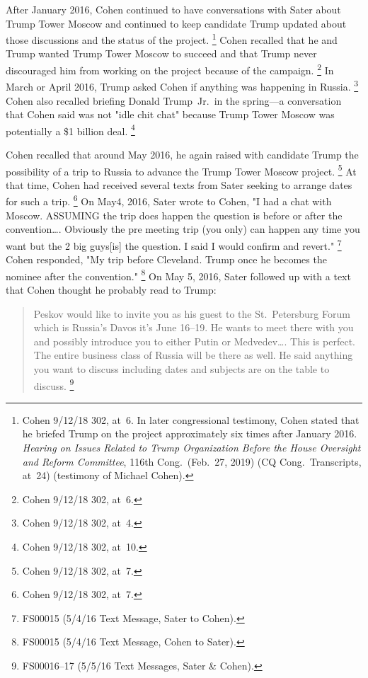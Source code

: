 {After January 2016, Cohen continued to have conversations with Sater about Trump Tower Moscow and continued to keep candidate Trump updated about those discussions and the status of the project.%
\footnote{Cohen 9/12/18 302, at~6.
In later congressional testimony, Cohen stated that he briefed Trump on the project approximately six times after January 2016.
\textit{Hearing on Issues Related to Trump Organization Before the House Oversight and Reform Committee}, 116th Cong.\ (Feb.~27, 2019) (CQ Cong.\ Transcripts, at~24) (testimony of Michael Cohen).}
Cohen recalled that he and Trump wanted Trump Tower Moscow to succeed and that Trump never discouraged him from working on the project because of the campaign.%
\footnote{Cohen 9/12/18 302, at~6.}
In March or April 2016, Trump asked Cohen if anything was happening in Russia.%
\footnote{Cohen 9/12/18 302, at~4.}
Cohen also recalled briefing Donald Trump~Jr.\ in the spring---a conversation that Cohen said was not "idle chit chat" because Trump Tower Moscow was potentially a \$1 billion deal.%
\footnote{Cohen 9/12/18 302, at~10.}

Cohen recalled that around May 2016, he again raised with candidate Trump the possibility of a trip to Russia to advance the Trump Tower Moscow project.%
\footnote{Cohen 9/12/18 302, at~7.}
At that time, Cohen had received several texts from Sater seeking to arrange dates for such a trip.%
\footnote{Cohen 9/12/18 302, at~7.}
On May4, 2016, Sater wrote to Cohen, "I had a chat with Moscow.
ASSUMING the trip does happen the question is before or after the convention\dots.
Obviously the pre meeting trip (you only) can happen any time you want but the 2 big guys[is] the question.
I said I would confirm and revert."%
\footnote{FS00015 (5/4/16 Text Message, Sater to Cohen).}
Cohen responded, "My trip before Cleveland.
Trump once he becomes the nominee after the convention."%
\footnote{FS00015 (5/4/16 Text Message, Cohen to Sater).}
On May 5, 2016, Sater followed up with a text that Cohen thought he probably read to Trump:

\begin{quote}
Peskov would like to invite you as his guest to the St.~Petersburg Forum which is Russia's Davos it's June 16--19.
He wants to meet there with you and possibly introduce you to either Putin or Medvedev\dots.
This is perfect.
The entire business class of Russia will be there as well.
He said anything you want to discuss including dates and subjects are on the table to discuss.%
\footnote{FS00016--17 (5/5/16 Text Messages, Sater \& Cohen).}
\end{quote}

}
